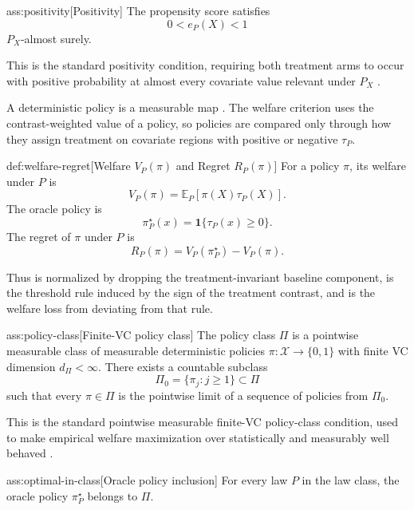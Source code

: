 \documentclass[11pt]{article}
\begin{document}
\begin{assumptionv}{ass:positivity}[Positivity]
The propensity score satisfies
\[
0<e_P(X)<1
\]
\(P_X\)-almost surely.
\end{assumptionv}

This is the standard positivity condition, requiring both treatment arms to occur with positive probability at almost every covariate value relevant under \(P_X\) \citep{Imbens2015}.

A deterministic policy is a measurable map .  The welfare criterion uses the contrast-weighted value of a policy, so policies are compared only through how they assign treatment on covariate regions with positive or negative \(\tau_P\).

\begin{definitionv}{def:welfare-regret}[Welfare \(V_P(\pi)\) and Regret \(R_P(\pi)\)]
For a policy \(\pi\), its welfare under \(P\) is
\[
V_P(\pi)=\mathbb E_P\!\left[\pi(X)\tau_P(X)\right].
\]
The oracle policy is
\[
\pi^\star_P(x)=\mathbf 1\{\tau_P(x)\ge 0\}.
\]
The regret of \(\pi\) under \(P\) is
\[
R_P(\pi)=V_P(\pi^\star_P)-V_P(\pi).
\]
\end{definitionv}

Thus  is normalized by dropping the treatment-invariant baseline component,  is the threshold rule induced by the sign of the treatment contrast, and  is the welfare loss from deviating from that rule.

\begin{assumptionv}{ass:policy-class}[Finite-VC policy class]
The policy class \(\Pi\) is a pointwise measurable class of measurable deterministic policies \(\pi:\mathcal X\to\{0,1\}\) with finite VC dimension \(d_\Pi<\infty\).  There exists a countable subclass
\[
\Pi_0=\{\pi_j:j\ge 1\}\subset\Pi
\]
such that every \(\pi\in\Pi\) is the pointwise limit of a sequence of policies from \(\Pi_0\).
\end{assumptionv}

This is the standard pointwise measurable finite-VC policy-class condition, used to make empirical welfare maximization over  statistically and measurably well behaved \citep{Kitagawa2018}.

\begin{assumptionv}{ass:optimal-in-class}[Oracle policy inclusion]
For every law \(P\) in the law class, the oracle policy \(\pi^\star_P\) belongs to \(\Pi\).
\end{assumptionv}
\end{document}
